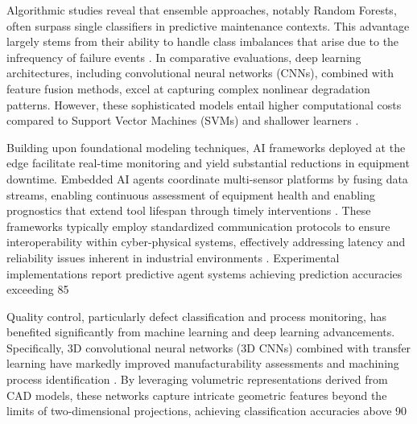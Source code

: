 \documentclass[11pt]{article}
\begin{document}
Algorithmic studies reveal that ensemble approaches, notably Random Forests, often surpass single classifiers in predictive maintenance contexts. This advantage largely stems from their ability to handle class imbalances that arise due to the infrequency of failure events \cite{ref29}. In comparative evaluations, deep learning architectures, including convolutional neural networks (CNNs), combined with feature fusion methods, excel at capturing complex nonlinear degradation patterns. However, these sophisticated models entail higher computational costs compared to Support Vector Machines (SVMs) and shallower learners \cite{ref24,ref32}.

Building upon foundational modeling techniques, AI frameworks deployed at the edge facilitate real-time monitoring and yield substantial reductions in equipment downtime. Embedded AI agents coordinate multi-sensor platforms by fusing data streams, enabling continuous assessment of equipment health and enabling prognostics that extend tool lifespan through timely interventions \cite{ref35}. These frameworks typically employ standardized communication protocols to ensure interoperability within cyber-physical systems, effectively addressing latency and reliability issues inherent in industrial environments \cite{ref36}. Experimental implementations report predictive agent systems achieving prediction accuracies exceeding 85%

Quality control, particularly defect classification and process monitoring, has benefited significantly from machine learning and deep learning advancements. Specifically, 3D convolutional neural networks (3D CNNs) combined with transfer learning have markedly improved manufacturability assessments and machining process identification \cite{ref39}. By leveraging volumetric representations derived from CAD models, these networks capture intricate geometric features beyond the limits of two-dimensional projections, achieving classification accuracies above 90%
\end{document}
